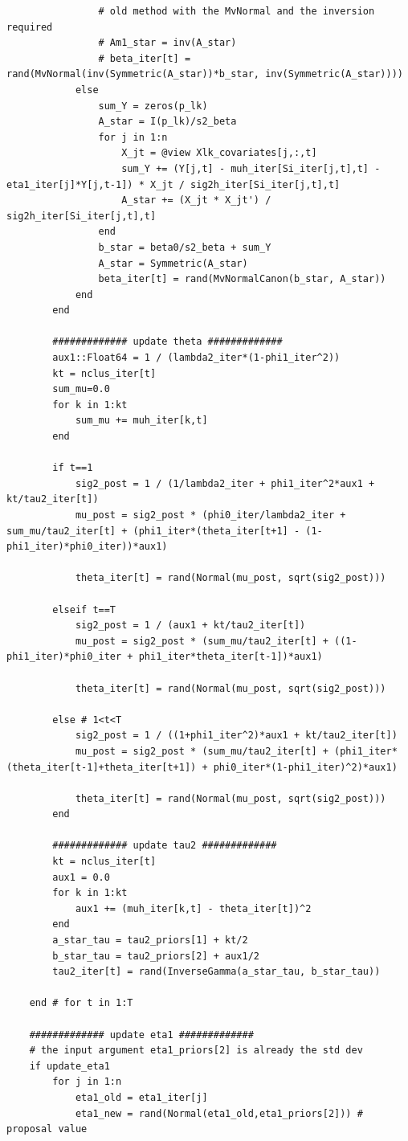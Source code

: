 \documentclass[12pt,	%
	a4paper,		%
	twoside,		%
	openright,		%
	titlepage,%
	]{book}
\theoremstyle{definition}
\newenvironment{code}{\captionsetup{type=listing}}{}
\begin{document}
\begin{code}
\begin{verbatim}
				# old method with the MvNormal and the inversion required
				# Am1_star = inv(A_star) 
				# beta_iter[t] = rand(MvNormal(inv(Symmetric(A_star))*b_star, inv(Symmetric(A_star))))
			else
				sum_Y = zeros(p_lk)
				A_star = I(p_lk)/s2_beta
				for j in 1:n
					X_jt = @view Xlk_covariates[j,:,t]
					sum_Y += (Y[j,t] - muh_iter[Si_iter[j,t],t] - eta1_iter[j]*Y[j,t-1]) * X_jt / sig2h_iter[Si_iter[j,t],t]
					A_star += (X_jt * X_jt') / sig2h_iter[Si_iter[j,t],t]
				end
				b_star = beta0/s2_beta + sum_Y
				A_star = Symmetric(A_star)
				beta_iter[t] = rand(MvNormalCanon(b_star, A_star))
			end
		end
					
		############# update theta #############
		aux1::Float64 = 1 / (lambda2_iter*(1-phi1_iter^2))
		kt = nclus_iter[t]
		sum_mu=0.0
		for k in 1:kt
			sum_mu += muh_iter[k,t]
		end

		if t==1
			sig2_post = 1 / (1/lambda2_iter + phi1_iter^2*aux1 + kt/tau2_iter[t])
			mu_post = sig2_post * (phi0_iter/lambda2_iter + sum_mu/tau2_iter[t] + (phi1_iter*(theta_iter[t+1] - (1-phi1_iter)*phi0_iter))*aux1)

			theta_iter[t] = rand(Normal(mu_post, sqrt(sig2_post)))

		elseif t==T
			sig2_post = 1 / (aux1 + kt/tau2_iter[t])
			mu_post = sig2_post * (sum_mu/tau2_iter[t] + ((1- phi1_iter)*phi0_iter + phi1_iter*theta_iter[t-1])*aux1)

			theta_iter[t] = rand(Normal(mu_post, sqrt(sig2_post)))

		else # 1<t<T
			sig2_post = 1 / ((1+phi1_iter^2)*aux1 + kt/tau2_iter[t])
			mu_post = sig2_post * (sum_mu/tau2_iter[t] + (phi1_iter*(theta_iter[t-1]+theta_iter[t+1]) + phi0_iter*(1-phi1_iter)^2)*aux1)

			theta_iter[t] = rand(Normal(mu_post, sqrt(sig2_post)))
		end 
		
		############# update tau2 #############
		kt = nclus_iter[t]
		aux1 = 0.0
		for k in 1:kt
			aux1 += (muh_iter[k,t] - theta_iter[t])^2 
		end
		a_star_tau = tau2_priors[1] + kt/2
		b_star_tau = tau2_priors[2] + aux1/2
		tau2_iter[t] = rand(InverseGamma(a_star_tau, b_star_tau))

	end # for t in 1:T
	
	############# update eta1 #############
	# the input argument eta1_priors[2] is already the std dev
	if update_eta1
		for j in 1:n
			eta1_old = eta1_iter[j]
			eta1_new = rand(Normal(eta1_old,eta1_priors[2])) # proposal value


\end{verbatim}
\end{code}
\end{document}
